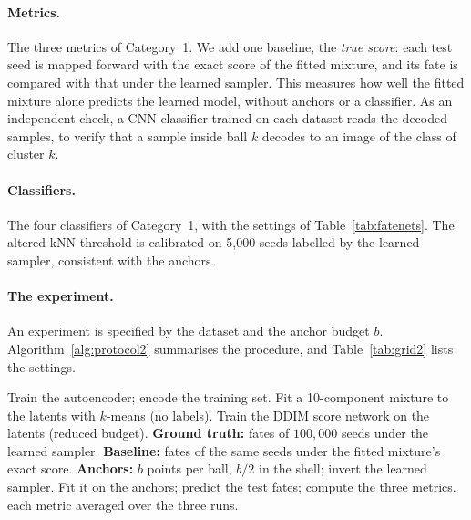\documentclass[11pt]{article}
\begin{document}
\paragraph{Metrics.}
The three metrics of Category~1. We add one baseline, the \emph{true score}: each test seed is
mapped forward with the exact score of the fitted mixture, and its fate is compared with that under
the learned sampler. This measures how well the fitted mixture alone predicts the learned model,
without anchors or a classifier. As an independent check, a CNN classifier trained on each dataset
reads the decoded samples, to verify that a sample inside ball $k$ decodes to an image of the
class of cluster $k$.

\paragraph{Classifiers.}
The four classifiers of Category~1, with the settings of Table~\ref{tab:fatenets}. The
altered-kNN threshold is calibrated on 5{,}000 seeds labelled by the learned sampler, consistent
with the anchors.

\paragraph{The experiment.}
An experiment is specified by the dataset and the anchor budget $b$. Algorithm~\ref{alg:protocol2}
summarises the procedure, and Table~\ref{tab:grid2} lists the settings.

\begin{algorithm}[!htbp]
\caption{Evaluation protocol for Category 2, for one dataset and anchor budget $b$}
\label{alg:protocol2}
\begin{algorithmic}[1]
  \State Train the autoencoder; encode the training set.
  \State Fit a 10-component mixture to the latents with $k$-means (no labels).
  \State Train the DDIM score network on the latents (reduced budget).
  \State \textbf{Ground truth:} fates of $100{,}000$ seeds under the learned sampler.
  \State \textbf{Baseline:} fates of the same seeds under the fitted mixture's exact score.
  \State \textbf{Anchors:} $b$ points per ball, $b/2$ in the shell; invert the learned sampler.
    \State Fit it on the anchors; predict the test fates; compute the three metrics.
  \EndFor
\EndFor
\State \Return each metric averaged over the three runs.
\end{algorithmic}
\end{algorithm}
\end{document}
